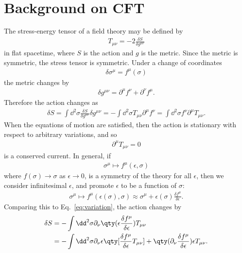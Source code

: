 \section{Background on CFT}
The stress-energy tensor of a field theory may be defined by
\begin{align}
T_{\mu \nu} = -2\frac{\delta S}{\delta g^{\mu \nu}}
\end{align}
in flat spacetime, where $S$ is the action and $g$ is the metric.
Since the metric is symmetric, the stress tensor
is symmetric.
Under a change of coordinates 
\begin{align}
\delta \sigma^\mu = f^\mu(\sigma)
\end{align}
the metric changes by
\begin{align}
  \delta g^{\mu \nu} = \partial^\mu f^\nu + \partial^\nu f^\mu.\label{eq:metric-change}
\end{align}
Therefore
the action changes as
\begin{align}
  \delta S = \int \dd^2 \sigma \frac{\delta S}{\delta g^{\mu \nu}}\delta g^{\mu \nu} = -\int \dd^2 \sigma T_{\mu \nu}\partial^\mu f^\nu = \int \dd^2 \sigma f^\nu \partial^\mu T_{\mu \nu}.\label{eq:variation}
\end{align}
When the equations of motion are satisfied, then the action is stationary with
respect to arbitrary variations, and so
\begin{align}
\partial^\mu T_{\mu \nu} = 0\label{eq:conservation}
\end{align}
is a conserved current. In general, if 
\begin{align}
\sigma^\mu \mapsto f^\mu(\epsilon, \sigma) \label{eq:symmetry}
\end{align}
where $f(\sigma) \to \sigma$ as $\epsilon \to 0$, is a symmetry of the theory for
all $\epsilon$, then we consider infinitesimal $\epsilon$, and promote
$\epsilon$ to be a function of $\sigma$:
\begin{align}
  \sigma^\mu \mapsto f^\mu(\epsilon(\sigma), \sigma) \approx \sigma^\mu + \epsilon(\sigma)\frac{\delta f^\mu}{\delta \epsilon}.
\end{align}
Comparing this to Eq.~\eqref{eq:variation},
the action changes by
\begin{align}
\delta S &= -\int \dd^2 \sigma \partial_\nu \qty(\epsilon \frac{\delta f^\mu}{\delta \epsilon})T_{\mu \nu} \\
&= -\int \dd^2 \sigma \partial_\nu \epsilon \qty[\frac{\delta f^\mu}{\delta \epsilon}T_{\mu \nu}] +\qty(\partial_\nu\frac{\delta f^\mu}{\delta \epsilon}) \epsilon T_{\mu \nu}.
\end{align}
